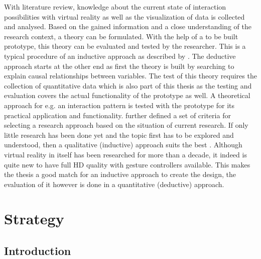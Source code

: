 With literature review, knowledge about the current state of interaction possibilities with virtual reality as well as the visualization of data is collected and analysed. Based on the gained information and a close understanding of the research context, a theory can be formulated. With the help of a to be built prototype, this theory can be evaluated and tested by the researcher. This is a typical procedure of an inductive approach as described by \cite{Saunders2009}. \newline
The deductive approach starts at the other end as first the theory is built by searching to explain causal relationships between variables. The test of this theory requires the collection of quantitative data which is also part of this thesis as the testing and evaluation covers the actual functionality of the prototype as well. A theoretical approach for e.g. an interaction pattern is tested with the prototype for its practical application and functionality. \newline
\cite{Creswell2014} further defined a set of criteria for selecting a research approach based on the situation of current research. If only little research has been done yet and the topic first has to be explored and understood, then a qualitative (inductive) approach suits the best \citep{Creswell2014}. Although virtual reality in itself has been researched for more than a decade, it indeed is quite new to have full HD quality with gesture controllers available. This makes the thesis a good match for an inductive approach to create the design, the evaluation of it however is done in a quantitative (deductive) approach.



\section{Strategy}


\subsection{Introduction}

